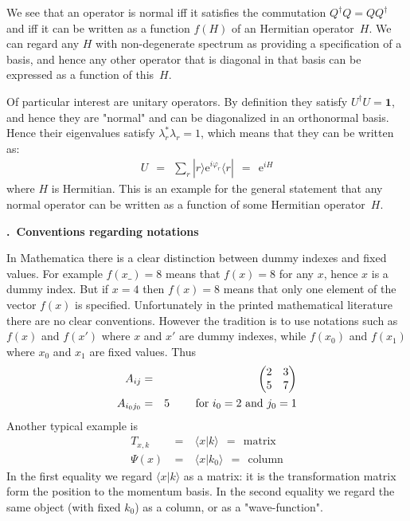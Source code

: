 \documentclass[onecolumn,fleqn, 11pt]{revtex4}
\newcommand{\eexp}{\mathrm{e}^}
\newcommand{\amatrix}[1]{\begin{matrix} #1 \end{matrix}}
\newcommand{\beq}{\begin{eqnarray}}
\newcommand{\eeq}{\end{eqnarray}}
\renewcommand{\thesubsection}{\arabic{subsection}}
\renewcommand{\thesubsubsection}{\arabic{subsubsection}}
\newcommand{\sheadC}[1]
{
\addtocounter{subsubsection}{1}
\vspace{5mm}
{\bf \thesubsection.\thesubsubsection \ #1}  
\nopagebreak
\phantomsection
}
\begin{document}
We see that an operator is normal iff it satisfies the 
commutation ${Q^{\dagger}Q=QQ^{\dagger}}$ and iff it 
can be written as a function $f(H)$ of an Hermitian operator~$H$.     
We can regard any $H$ with non-degenerate 
spectrum as providing a specification of a basis, 
and hence any other operator that is diagonal in that basis 
can be expressed as a function of this~$H$.  


Of particular interest are unitary operators. 
By definition they satisfy ${U^{\dagger}U=\mathbf{1}}$, 
and hence they are "normal" and can be diagonalized in an orthonormal basis. 
Hence their eigenvalues satisfy ${\lambda_{r}^{*}\lambda _{r}=1}$, 
which means that they can be written as:
\beq
U \ \ = \ \ \sum_{r} |r \rangle \eexp{ i \varphi_{r}} \langle r| \ \ = \ \ \eexp{iH}
\eeq
where $H$ is Hermitian. This is an example for the general 
statement that any normal operator can be written as a function 
of some Hermitian operator~$H$. 


\sheadC{Conventions regarding notations} 

In Mathematica there is a clear distinction between   
dummy indexes and fixed values. For example $f( x\_ )=8$ 
means that $f(x)=8$ for any $x$, hence $x$ is a dummy index.   
But if $x=4$ then $f(x)=8$ means that only one element 
of the vector $f(x)$ is specified.  Unfortunately  in the 
printed mathematical literature there are no clear conventions. 
However the tradition is to use notations such 
as $f(x)$ and $f(x')$ where $x$ and $x'$ are dummy indexes,  
while $f(x_0)$ and $f(x_1)$ where $x_0$ and $x_1$ are fixed values.   
Thus 
\beq
A_{ij} &=& \left(\amatrix{2 & 3 \cr 5 & 7}\right) 
\\ \nonumber
A_{i_0j_0} &=& 5  \ \ \ \ \ \ \ \mbox{for $i_0=2$ and $j_0=1$}
\eeq
Another typical example is 
\beq
T_{x,k} \ &=& \  \langle x | k \rangle \ \ = \ \ \text{matrix}
\\
\Psi(x) \ &=& \ \langle x | k_0 \rangle \ \ = \ \ \text{column}
\eeq
In the first equality we regard $\langle x | k \rangle$ 
as a matrix: it is the transformation matrix form the 
position to the momentum basis. In the second equality 
we regard the same object (with fixed $k_0$) as a column, 
or as a "wave-function". 
\end{document}
